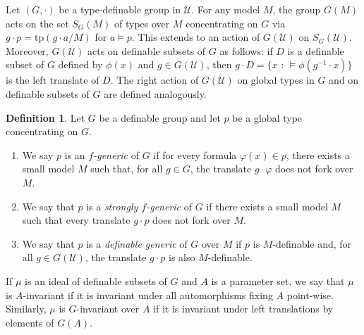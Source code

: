 \documentclass[12pt]{article}
\newcommand{\tpp}{\mathrm{tp}}
\newcommand{\NIP}{\mathrm{NIP}}
\newcommand{\NTP}{\mathrm{NTP_2}}
\newcommand{\0}{\emptyset}
\newcommand{\U}{\mathcal{U}}
\theoremstyle{plain}%
\theoremstyle{definition}
\newtheorem{defn}[thm]{Definition}
\theoremstyle{remark}
\begin{document}
Let $(G, \cdot)$ be a type-definable group in $\U$. For any model $M$, the group $G(M)$ acts on the set $S_G(M)$ of types over $M$ concentrating on $G$ via $g\cdot p = \tpp(g\cdot a/M)$ for $a\models p$. This extends to an action of $G(\U)$ on $S_G(\U)$. Moreover, $G(\U)$ acts on definable subsets of $G$ as follows: if $D$ is a definable subset of $G$ defined by $\phi(x)$ and $g \in G(\U)$, then $g \cdot D=\{x\text{ : }\models \phi(g^{-1}\cdot x)\}$ is the left translate of $D$. The right action of $G(\U)$ on global types in $G$ and on definable subsets of $G$ are defined analogously.
\begin{defn}
    Let $G$ be a definable group and let $p$ be a global type concentrating on $G$. 
    \begin{enumerate}
    \item We say $p$ is an \textit{$f$-generic} of $G$ if for every formula $\varphi(x)\in p$, there exists a small model $M$ such that, for all $g\in G$, the translate $g\cdot \varphi$ does not fork over $M$.
    
    \item   We say that $p$ is a \textit{strongly $f$-generic} of $G$ if there exists a small model $M$ such that every translate $g\cdot p$ does not fork over $M$. 

    \item We say that $p$ is a \emph{definable generic} of $G$ over $M$ if $p$ is $M$-definable and, for all $g \in G(\U)$, the translate $g \cdot p$ is also $M$-definable.
    \end{enumerate}

  
    \end{defn}



If $\mu$ is an ideal of definable subsets of $G$ and $A$ is a parameter set, we say that $\mu$ is $A$-invariant if it is invariant under all automorphisms fixing $A$ point-wise. Similarly, $\mu$ is $G$-invariant over $A$ if it is invariant under left translations by elements of $G(A)$.
\end{document}

